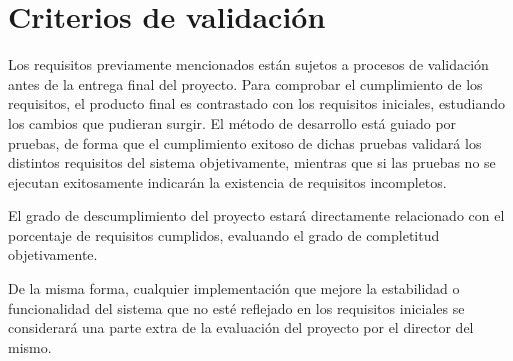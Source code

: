\section{Criterios de validación}

	Los requisitos previamente mencionados están sujetos a procesos de validación antes de la entrega final del proyecto. Para comprobar el cumplimiento de los requisitos, el producto final es contrastado con los requisitos iniciales, estudiando los cambios que pudieran surgir. El método de desarrollo está guiado por pruebas, de forma que el cumplimiento exitoso de dichas pruebas validará los distintos requisitos del sistema objetivamente, mientras que si las pruebas no se ejecutan exitosamente indicarán la existencia de requisitos incompletos.

	El grado de descumplimiento del proyecto estará directamente relacionado con el porcentaje de requisitos cumplidos, evaluando el grado de completitud objetivamente.

	De la misma forma, cualquier implementación que mejore la estabilidad o funcionalidad del sistema que no esté reflejado en los requisitos iniciales se considerará una parte extra de la evaluación del proyecto por el director del mismo.